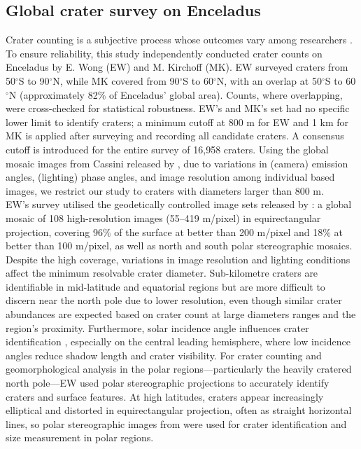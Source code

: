 \documentclass[preprint,11pt,3p,times,authoryear]{elsarticle}
\begin{document}
\subsection{Global crater survey on Enceladus}
\label{sub:survey}
Crater counting is a subjective process whose outcomes vary among researchers \citep{Robbins2014}. To ensure reliability, this study independently conducted crater counts on Enceladus by E. Wong (EW) and M. Kirchoff (MK). EW surveyed craters from 50$^\circ$S to 90$^\circ$N, while MK covered from 90$^\circ$S to 60$^\circ$N, with an overlap at 50$^\circ$S to 60$^\circ$N (approximately 82\% of Enceladus' global area). Counts, where overlapping, were cross-checked for statistical robustness. EW’s and MK’s set had no specific lower limit to identify craters; a minimum cutoff at 800 m for EW and 1 km for MK is applied after surveying and recording all candidate craters. A consensus cutoff is introduced for the entire survey of 16,958 craters. Using the global mosaic images from Cassini released by \citet{Bland2018}, due to variations in (camera) emission angles, (lighting) phase angles, and image resolution among individual based images, we restrict our study to craters with diameters larger than 800 m. \\

EW’s survey utilised the geodetically controlled image sets released by \citet{Bland2018}: a global mosaic of 108 high-resolution images (55–419 m/pixel) in equirectangular projection, covering 96\% of the surface at better than 200 m/pixel and 18\% at better than 100 m/pixel, as well as north and south polar stereographic mosaics. Despite the high coverage, variations in image resolution and lighting conditions affect the minimum resolvable crater diameter. Sub-kilometre craters are identifiable in mid-latitude and equatorial regions but are more difficult to discern near the north pole due to lower resolution, even though similar crater abundances are expected based on crater count at large diameters ranges and the region's proximity. Furthermore, solar incidence angle influences crater identification \citep{Ostrach2011, Robbins2025}, especially on the central leading hemisphere, where low incidence angles reduce shadow length and crater visibility. For crater counting and geomorphological analysis in the polar regions—particularly the heavily cratered north pole—EW used polar stereographic projections to accurately identify craters and surface features. At high latitudes, craters appear increasingly elliptical and distorted in equirectangular projection, often as straight horizontal lines, so polar stereographic images from \citet{Bland2018} were used for crater identification and size measurement in polar regions.\\
\end{document}
